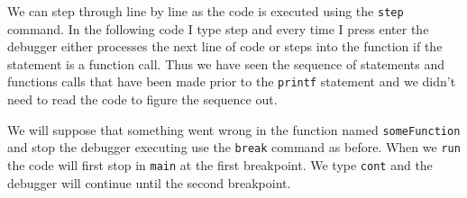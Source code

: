 We can step through line by line as the code is executed
using the \texttt{step} command. In the following code I type step and every time I press enter the debugger either processes the next line of code or steps into the function if the statement is a function call. 
Thus we have seen the sequence of statements and functions calls that have been made prior to the \texttt{printf} statement and we didn't need to read the code to figure the sequence out. 

We will suppose that something went wrong in the function named \texttt{someFunction} and stop the debugger executing use the \texttt{break} command as before. When we \texttt{run} the code will first stop in \texttt{main} at the first breakpoint. We type \texttt{cont} and the debugger will continue until the second breakpoint.

